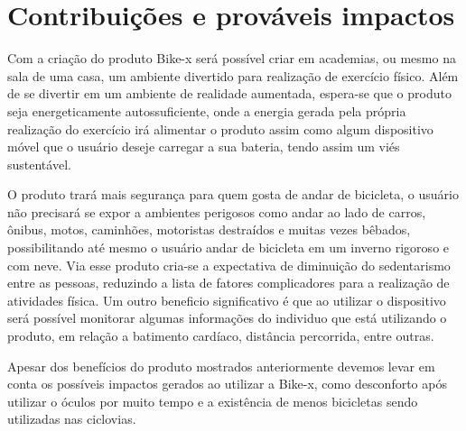\chapter[Impactos]{Contribuições e prováveis impactos}

Com a criação do produto Bike-x será possível criar em academias, ou mesmo na sala de uma casa, um ambiente divertido para realização de exercício físico. Além de se divertir em um ambiente de realidade aumentada, espera-se que o produto seja energeticamente autossuficiente, onde a energia gerada pela própria realização do exercício irá alimentar o produto assim como algum dispositivo móvel que o usuário deseje carregar a sua bateria, tendo assim um viés sustentável.  

O produto trará mais segurança para quem gosta de andar de bicicleta, o usuário não precisará se expor a ambientes perigosos como andar ao lado de carros, ônibus, motos, caminhões, motoristas destraídos e muitas vezes bêbados, possibilitando até mesmo o usuário andar de bicicleta em um inverno rigoroso e com neve. Via esse produto cria-se a expectativa de diminuição do sedentarismo entre as pessoas, reduzindo a lista de fatores complicadores para a realização de atividades física. Um outro beneficio significativo é que ao utilizar o dispositivo será possível monitorar algumas informações do individuo que está utilizando o produto, em relação a batimento cardíaco, distância percorrida, entre outras.

Apesar dos benefícios do produto mostrados anteriormente devemos levar em conta os possíveis impactos gerados ao utilizar a Bike-x, como desconforto após utilizar o óculos por muito tempo e a existência de menos bicicletas sendo utilizadas nas ciclovias.
